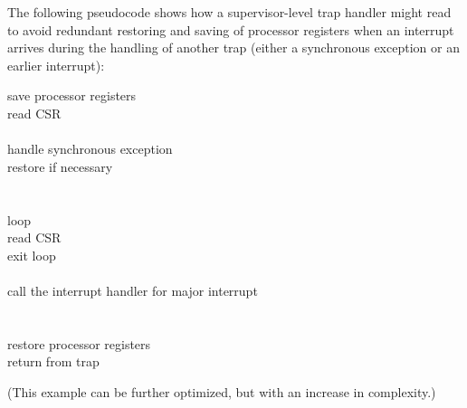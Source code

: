 The following pseudocode shows how a supervisor-level trap handler
might read  to avoid redundant restoring and saving of
processor registers when an interrupt arrives during the handling of
another trap (either a synchronous exception or an earlier interrupt):
\begin{displayLinesTable}
save processor registers \\
read CSR  \\
 \\
\qquad handle synchronous exception  \\
\qquad restore  if necessary \\
\z{\RB}\\
 \\
\qquad loop \z{\LB} \\
\qquad\qquad {}read CSR  \\
\qquad\qquad {} exit loop \\
\qquad\qquad {} \\
\qquad\qquad call the interrupt handler for major interrupt  \\
\qquad \z{\RB} \\
\z{\RB} \\
restore processor registers \\
return from trap \\
\end{displayLinesTable}
(This example can be further optimized, but with an increase in
complexity.)

